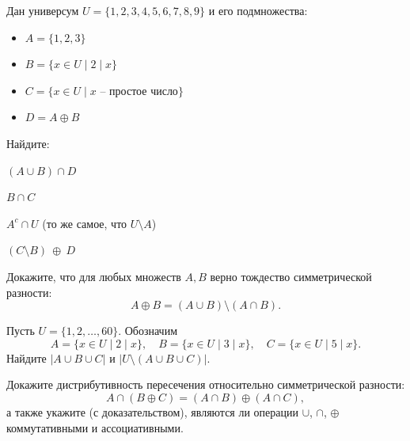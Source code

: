 \documentclass[a4paper,12pt,oneside]{article}
\begin{document}
Дан универсум $U=\{1,2,3,4,5,6,7,8,9\}$ и его подмножества:
\begin{itemize}
    \item $A=\{1,2,3\}$
    \item $B=\{x\in U \mid 2\mid x\}$
    \item $C=\{x\in U \mid x \text{ – простое число}\}$
    \item $D=A\oplus B$
\end{itemize}
Найдите:
\begin{numlist}
    \item $(A \cup B)\cap D$
    \item $B \cap C$
    \item $A^{c}\cap U$ \quad(то же самое, что $U\setminus A$)
    \item $(C \setminus B)\ \oplus\ D$
\end{numlist}

\begin{numlist}
    \item Докажите, что для любых множеств $A,B$ верно тождество симметрической разности:
    \[
       A\oplus B=(A\cup B)\setminus(A\cap B).
    \]
    \item Пусть $U=\{1,2,\dots,60\}$. Обозначим
    \[
      A=\{x\in U \mid 2\mid x\},\quad
      B=\{x\in U \mid 3\mid x\},\quad
      C=\{x\in U \mid 5\mid x\}.
    \]
    Найдите $|A\cup B\cup C|$ и $|U\setminus(A\cup B\cup C)|$.
    \item Докажите дистрибутивность пересечения относительно симметрической разности:
    \[
      A\cap(B\oplus C)=(A\cap B)\oplus(A\cap C),
    \]
    а также укажите (с доказательством), являются ли операции $\cup$, $\cap$, $\oplus$ коммутативными и ассоциативными.
\end{numlist}
\end{document}
